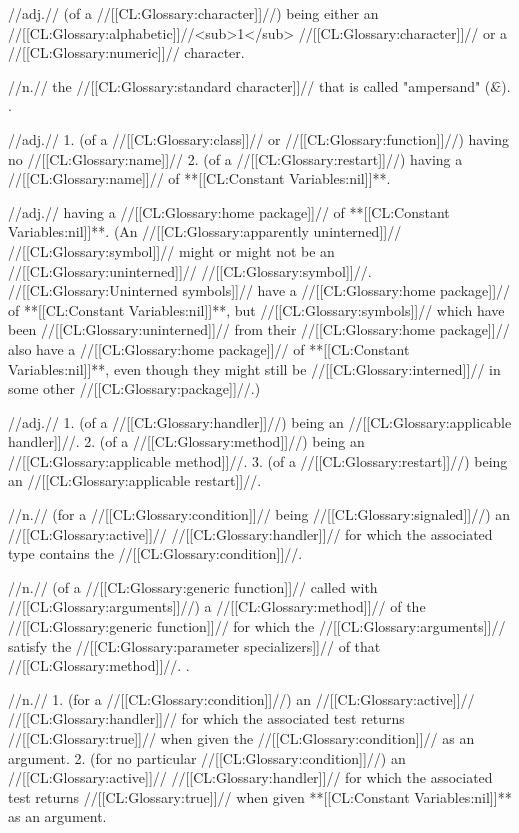  //adj.// (of a //[[CL:Glossary:character]]//) being either an //[[CL:Glossary:alphabetic]]//<sub>1</sub> //[[CL:Glossary:character]]// or a //[[CL:Glossary:numeric]]// {character}.

 //n.// the //[[CL:Glossary:standard character]]// that is called "ampersand" (\f{\&}). \Seefigure\StdCharsThree.

 //adj.// 1. (of a //[[CL:Glossary:class]]// or //[[CL:Glossary:function]]//) having no //[[CL:Glossary:name]]// 2. (of a //[[CL:Glossary:restart]]//) having a //[[CL:Glossary:name]]// of **[[CL:Constant Variables:nil]]**.

 //adj.// having a //[[CL:Glossary:home package]]// of **[[CL:Constant Variables:nil]]**. (An //[[CL:Glossary:apparently uninterned]]// //[[CL:Glossary:symbol]]// might or might not be an //[[CL:Glossary:uninterned]]// //[[CL:Glossary:symbol]]//. //[[CL:Glossary:Uninterned symbols]]// have a //[[CL:Glossary:home package]]// of **[[CL:Constant Variables:nil]]**, but //[[CL:Glossary:symbols]]// which have been //[[CL:Glossary:uninterned]]// from their //[[CL:Glossary:home package]]// also have a //[[CL:Glossary:home package]]// of **[[CL:Constant Variables:nil]]**, even though they might still be //[[CL:Glossary:interned]]// in some other //[[CL:Glossary:package]]//.)

 //adj.// 1. (of a //[[CL:Glossary:handler]]//) being an //[[CL:Glossary:applicable handler]]//. 2. (of a //[[CL:Glossary:method]]//) being an //[[CL:Glossary:applicable method]]//. 3. (of a //[[CL:Glossary:restart]]//) being an //[[CL:Glossary:applicable restart]]//.

 //n.// (for a //[[CL:Glossary:condition]]// being //[[CL:Glossary:signaled]]//) an //[[CL:Glossary:active]]// //[[CL:Glossary:handler]]// for which the associated type contains the //[[CL:Glossary:condition]]//.

 //n.// (of a //[[CL:Glossary:generic function]]// called with //[[CL:Glossary:arguments]]//) a //[[CL:Glossary:method]]// of the //[[CL:Glossary:generic function]]// for which the //[[CL:Glossary:arguments]]// satisfy the //[[CL:Glossary:parameter specializers]]// of that //[[CL:Glossary:method]]//. \Seesection\SelApplMeth.

 //n.// 1. (for a //[[CL:Glossary:condition]]//) an //[[CL:Glossary:active]]// //[[CL:Glossary:handler]]// for which the associated test returns //[[CL:Glossary:true]]// when given the //[[CL:Glossary:condition]]// as an argument. 2. (for no particular //[[CL:Glossary:condition]]//) an //[[CL:Glossary:active]]// //[[CL:Glossary:handler]]// for which the associated test returns //[[CL:Glossary:true]]// when given **[[CL:Constant Variables:nil]]** as an argument.

